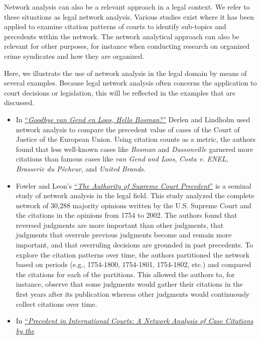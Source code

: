 Network analysis can also be a relevant approach in a legal context. We
refer to these situations as legal network analysis. Various studies
exist where it has been applied to examine citation patterns of courts
to identify sub-topics and precedents within the network. The network
analytical approach can also be relevant for other purposes, for
instance when conducting research on organized crime syndicates and how
they are organized.

Here, we illustrate the use of network analysis in the legal domain by
means of several examples. Because legal network analysis often concerns
the application to court decisions or legislation, this will be
reflected in the examples that are discussed.

\begin{itemize}
\item
  In \href{https://doi.org/10.1111/eulj.12077}{``\emph{Goodbye van Gend
  en Loos, Hello Bosman}?''} Derlen and Lindholm used network analysis
  to compare the precedent value of cases of the Court of Justice of the
  European Union. Using citation counts as a metric, the authors found
  that less well-known cases like \emph{Bosman} and \emph{Dassonville}
  garnered more citations than famous cases like \emph{van Gend and
  Loos}, \emph{Costa v. ENEL}, \emph{Brasserie du Pêcheur}, and
  \emph{United Brands}.
\item
  Fowler and Leon's
  \href{https://doi.org/10.1016/j.socnet.2007.05.001}{``\emph{The
  Authority of Supreme Court Precedent}''} is a seminal study of network
  analysis in the legal field. This study analyzed the complete network
  of 30,288 majority opinions written by the U.S. Supreme Court and the
  citations in the opinions from 1754 to 2002. The authors found that
  reversed judgments are more important than other judgments, that
  judgments that overrule previous judgments become and remain more
  important, and that overruling decisions are grounded in past
  precedents. To explore the citation patterns over time, the authors
  partitioned the network based on periods (e.g., 1754-1800, 1754-1801,
  1754-1802, etc.) and compared the citations for each of the
  partitions. This allowed the authors to, for instance, observe that
  some judgments would gather their citations in the first years after
  its publication whereas other judgments would continuously collect
  citations over time.
\item
  In \href{https://doi.org/10.1017/S0007123411000433}{``\emph{Precedent
  in International Courts: A Network Analysis of Case Citations by the
}}
\end{itemize}
